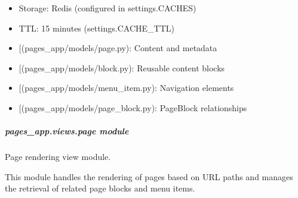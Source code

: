 \documentclass[letterpaper,10pt,english]{sphinxmanual}
\begin{document}
\begin{fulllineitems}
\begin{description}
\begin{itemize}
\item {} 
\sphinxAtStartPar
Storage: Redis (configured in settings.CACHES)

\item {} 
\sphinxAtStartPar
TTL: 15 minutes (settings.CACHE\_TTL)

\end{itemize}

\begin{itemize}
\item {} 
\sphinxAtStartPar
{[}\sphinxtitleref{Page}{]}(pages\_app/models/page.py): Content and metadata

\item {} 
\sphinxAtStartPar
{[}\sphinxtitleref{Block}{]}(pages\_app/models/block.py): Reusable content blocks

\item {} 
\sphinxAtStartPar
{[}\sphinxtitleref{MenuItem}{]}(pages\_app/models/menu\_item.py): Navigation elements

\item {} 
\sphinxAtStartPar
{[}\sphinxtitleref{PageBlock}{]}(pages\_app/models/page\_block.py): Page\sphinxhyphen{}Block relationships

\end{itemize}

\end{description}

\end{fulllineitems}



\subparagraph{pages\_app.views.page module}
\label{\detokenize{pages_app.views:module-pages_app.views.page}}\label{\detokenize{pages_app.views:pages-app-views-page-module}}
\sphinxAtStartPar
Page rendering view module.

\sphinxAtStartPar
This module handles the rendering of pages based on URL paths and manages
the retrieval of related page blocks and menu items.
\end{document}
